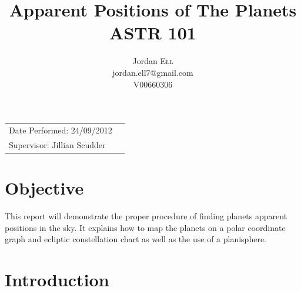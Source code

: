 \documentclass{article}
\title{Apparent Positions of The Planets \\ ASTR 101} %
\author{Jordan \textsc{Ell} \\ jordan.ell7@gmail.com \\ V00660306} %
\begin{document}
\maketitle %

\begin{tabular}{lr}
Date Performed: 24/09/2012 \\ %
Supervisor: Jillian Scudder %
\end{tabular}

\setlength\parindent{0pt} %

\renewcommand{\labelenumi}{\alph{enumi}.} %


\section{Objective}

This report will demonstrate the proper procedure of finding planets apparent positions in the sky.
It explains how to map the planets on a polar coordinate graph and ecliptic constellation chart as well as the 
use of a planisphere.\\
 

\section{Introduction}
\end{document}
